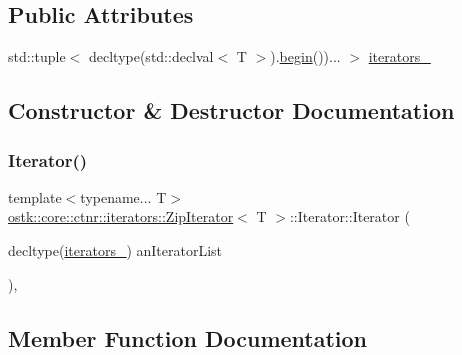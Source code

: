 \subsection*{Public Attributes}
\begin{DoxyCompactItemize}
\item 
std\+::tuple$<$ decltype(std\+::declval$<$ T $>$).\hyperlink{classostk_1_1core_1_1ctnr_1_1iterators_1_1_zip_iterator_a9fd76a0b2306f00757c5a09accef725a}{begin}())... $>$ \hyperlink{classostk_1_1core_1_1ctnr_1_1iterators_1_1_zip_iterator_1_1_iterator_a37f6521fb9d0c8ec3ab94c56c06dd475}{iterators\+\_\+}
\end{DoxyCompactItemize}


\subsection{Constructor \& Destructor Documentation}
\mbox{\label{classostk_1_1core_1_1ctnr_1_1iterators_1_1_zip_iterator_1_1_iterator_acedc2e5184ab630d05c1b787c9052d50}} 
\subsubsection{\texorpdfstring{Iterator()}{Iterator()}}
{\footnotesize\ttfamily template$<$typename... T$>$ \\
\hyperlink{classostk_1_1core_1_1ctnr_1_1iterators_1_1_zip_iterator}{ostk\+::core\+::ctnr\+::iterators\+::\+Zip\+Iterator}$<$ T $>$\+::Iterator\+::\+Iterator (\begin{DoxyParamCaption}\item[{decltype(\hyperlink{classostk_1_1core_1_1ctnr_1_1iterators_1_1_zip_iterator_1_1_iterator_a37f6521fb9d0c8ec3ab94c56c06dd475}{iterators\+\_\+})}]{an\+Iterator\+List }\end{DoxyParamCaption})\hspace{0.3cm}{\ttfamily [inline]}, {\ttfamily [explicit]}}



\subsection{Member Function Documentation}
\mbox{\label{classostk_1_1core_1_1ctnr_1_1iterators_1_1_zip_iterator_1_1_iterator_abebad80eb725d8770ca4fd907aeaff25}} 

